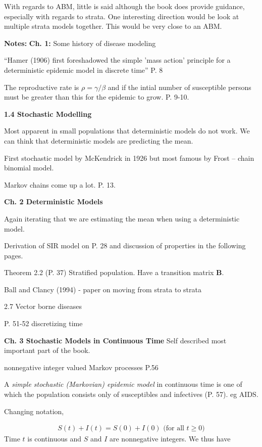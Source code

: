 \documentclass{article}
\begin{document}
With regards to ABM, little is said although the book does provide guidance, especially with regards to strata.  One interesting direction would be look at multiple strata models together.  This would be very close to an ABM.

\textbf{Notes:}
\textbf{Ch. 1:}  Some history of disease modeling

``Hamer (1906) first foreshadowed the simple 'mass action' principle for a deterministic epidemic model in discrete time'' P. 8

The reproductive rate is $\rho= \gamma/\beta$ and if the intial number of susceptible persons must be greater than this for the epidemic to grow.  P. 9-10.

\textbf{1.4 Stochastic Modelling}

Most apparent in small populations that deterministic models do not work.  We can think that deterministic models are predicting the mean.

First stochastic model by McKendrick in 1926 but most famous by Frost -- chain binomial model.

Markov chains come up a lot.  P. 13.

\textbf{Ch. 2 Deterministic Models}

Again iterating that we are estimating the mean when using a deterministic model.

Derivation of SIR model on P. 28 and discussion of properties in the following pages.

Theorem 2.2 (P. 37) Stratified population.  Have a transition matrix $\textbf{B}$.

Ball and Clancy (1994) - paper on moving from strata to strata

2.7 Vector borne diseases

P. 51-52 discretizing time

\textbf{Ch. 3 Stochastic Models in Continuous Time}
Self described most important part of the book.

nonnegative integer valued Markov processes P.56

A \textit{simple stochastic (Markovian) epidemic model} in continuous time is one of which the population consists only of susceptibles and infectives (P. 57).  eg AIDS.  

Changing notation,

\begin{align*}
S(t) + I(t) = S(0) + I(0) \text{ (for all } t \ge 0)
\end{align*}
Time $t$ is continuous and $S$ and $I$ are nonnegative integers.  We thus have
\end{document}
